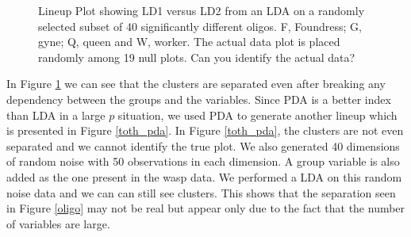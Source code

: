\begin{figure}[hbtp]
   \centering
       \caption{Lineup Plot showing LD1 versus LD2 from an LDA on a randomly selected subset of 40 significantly different oligos. F, Foundress; G, gyne; Q, queen and W, worker. The actual data plot is placed randomly among 19 null plots. Can you identify the actual data?  }
       \label{toth_lineup}
\end{figure} 

In Figure \ref{toth_lineup} we can see that the clusters are separated even after breaking any dependency between the groups and the variables. Since PDA is a better index than LDA in a large $p$ situation, we used PDA to generate another lineup which is presented in Figure \ref{toth_pda}. In Figure \ref{toth_pda}, the clusters are not even separated and we cannot identify the true plot. We also generated 40 dimensions of random noise with 50 observations in each dimension. A group variable is also added as the one present in the wasp data. We performed a LDA on this random noise data and we can can still see clusters.  This shows that the separation seen in Figure \ref{oligo} may not be real but appear only due to the fact that the number of variables are large.

